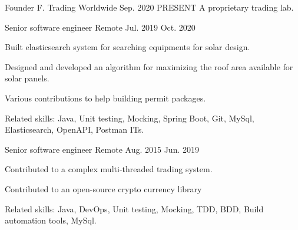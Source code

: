 

\begin{cventries}
    
  \cventry
    {Founder} %
    {F. Trading} %
    {Worldwide} %
    {Sep. 2020 \textemdash{} PRESENT} %
    {
    	A proprietary trading lab.
    }
    
  \cventry
    {Senior software engineer} %
    {} %
    {Remote} %
    {Jul. 2019 \textemdash{} Oct. 2020} %
    {
      \begin{cvitems}
      \item{Built elasticsearch system for searching equipments for solar design.}
      \item{Designed and developed an algorithm for maximizing the roof area available for solar panels.}
      \item{Various contributions to help building permit packages.}
      \end{cvitems}
      Related skills: Java, Unit testing, Mocking, Spring Boot, Git, MySql, Elasticsearch, OpenAPI, Postman ITs.
    }
   
  \cventry
    {Senior software engineer} %
    {} %
    {Remote} %
    {Aug. 2015 \textemdash{} Jun. 2019} %
    {    
      \begin{cvitems}
      \item{Contributed to a complex multi-threaded trading system.}
      \item{Contributed to an open-source crypto currency library }
      \end{cvitems}
      Related skills: Java, DevOps, Unit testing, Mocking, TDD, BDD, Build automation tools, MySql.
    }
    

\end{cventries}
